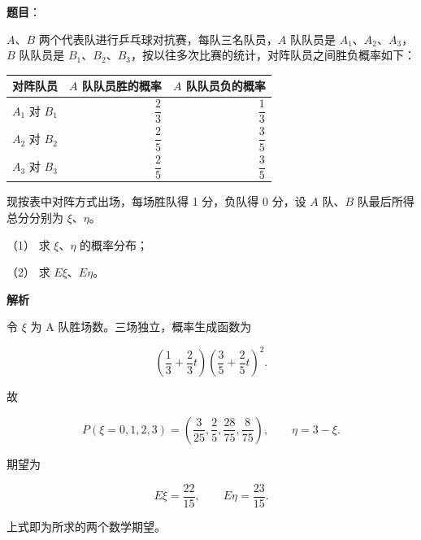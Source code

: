 \begin{answer}

\textbf{题目}：

$A\text{、}B$ 两个代表队进行乒乓球对抗赛，每队三名队员，$A$ 队队员是 $A_1\text{、}A_2\text{、}A_3$，$B$ 队队员是 $B_1\text{、}B_2\text{、}B_3$，按以往多次比赛的统计，对阵队员之间胜负概率如下：

\begin{center}
\begin{tabular}{lrr}
\toprule
对阵队员 & $A$ 队队员胜的概率 & $A$ 队队员负的概率 \\
\midrule
$A_1$ 对 $B_1$ & $\dfrac23$ & $\dfrac13$ \\
$A_2$ 对 $B_2$ & $\dfrac25$ & $\dfrac35$ \\
$A_3$ 对 $B_3$ & $\dfrac25$ & $\dfrac35$ \\
\bottomrule
\end{tabular}
\end{center}

现按表中对阵方式出场，每场胜队得 1 分，负队得 0 分，设 $A$ 队、$B$ 队最后所得总分分别为 $\xi\text{、}\eta$。

（1） 求 $\xi\text{、}\eta$ 的概率分布；

（2） 求 $E\xi\text{、}E\eta$。

\textbf{解析}


令 $\xi$ 为 A 队胜场数。三场独立，概率生成函数为

\nopagebreak[4]
\[
\left(\frac13+\frac23t\right)
\left(\frac35+\frac25t\right)^2.
\]

故

\nopagebreak[4]
\[
P(\xi=0,1,2,3)
=\left(\frac3{25},\frac25,\frac{28}{75},\frac8{75}\right),
\qquad \eta=3-\xi.
\]

期望为

\nopagebreak[4]
\[
E\xi=\frac{22}{15},\qquad E\eta=\frac{23}{15}.
\]


上式即为所求的两个数学期望。



\end{answer}
